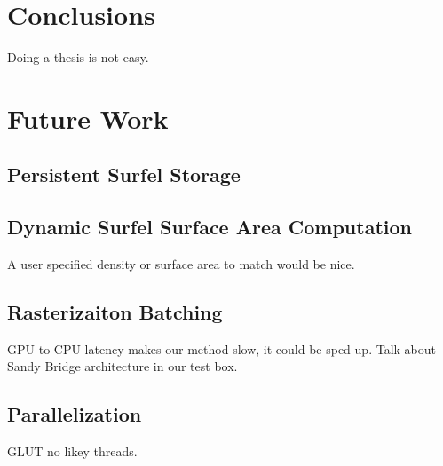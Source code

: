 \section{Conclusions}
Doing a thesis is not easy.

\section{Future Work}

\subsection{Persistent Surfel Storage}

\subsection{Dynamic Surfel Surface Area Computation}
A user specified density or surface area to match would be nice.

\subsection{Rasterizaiton Batching}
GPU-to-CPU latency makes our method slow, it could be sped up. Talk about Sandy Bridge architecture in our test box.

\subsection{Parallelization}
GLUT no likey threads.

